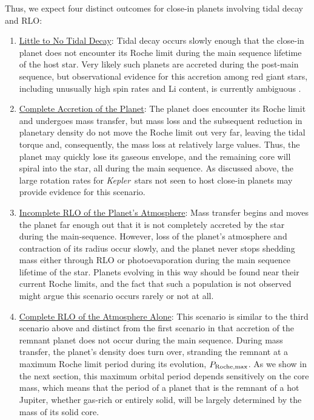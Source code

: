 \documentclass{svjour3}                     %
\newcommand{\kepler}{\emph{Kepler}}
\begin{document}
Thus, we expect four distinct outcomes for close-in planets involving tidal decay and RLO:
\begin{enumerate}
\item \underline{Little to No Tidal Decay}: Tidal decay occurs slowly enough that the close-in planet does not encounter its Roche limit during the main sequence lifetime of the host star. Very likely such planets are accreted during the post-main sequence, but observational evidence for this accretion among red giant stars, including unusually high spin rates and Li content, is currently ambiguous \cite{2012ApJ...757..109C}.

\item \underline{Complete Accretion of the Planet}: The planet does encounter its Roche limit and undergoes mass transfer, but mass loss and the subsequent reduction in planetary density do not move the Roche limit out very far, leaving the tidal torque and, consequently, the mass loss at relatively large values. Thus, the planet may quickly lose its gaseous envelope, and the remaining core will spiral into the star, all during the main sequence. As discussed above, the large rotation rates for \kepler\ stars not seen to host close-in planets \cite{2013ApJ...775L..11M} may provide evidence for this scenario.

\item \underline{Incomplete RLO of the Planet's Atmosphere}: Mass transfer begins and moves the planet far enough out that it is not completely accreted by the star during the main-sequence. However, loss of the planet's atmosphere and contraction of its radius occur slowly, and the planet never stops shedding mass either through RLO or photoevaporation during the main sequence lifetime of the star. Planets evolving in this way should be found near their current Roche limits, and the fact that such a population is not observed might argue this scenario occurs rarely or not at all.

\item \underline{Complete RLO of the Atmosphere Alone}: This scenario is similar to the third scenario above and distinct from the first scenario in that accretion of the remnant planet does not occur during the main sequence. During mass transfer, the planet's density does turn over, stranding the remnant at a maximum Roche limit period during its evolution, $P_{\rm Roche, max}$. As we show in the next section, this maximum orbital period depends sensitively on the core mass, which means that the period of a planet that is the remnant of a hot Jupiter, whether gas-rich or entirely solid, will be largely determined by the mass of its solid core. 

\end{enumerate}
\end{document}
